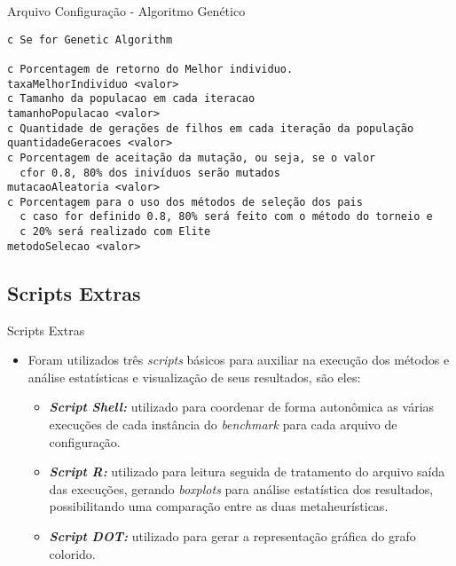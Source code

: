 			\begin{frame}[fragile]{Arquivo Configuração - Algoritmo Genético}
				
					
					{
						\footnotesize
						\begin{block}{}
							
							\begin{verbatim}
c Se for Genetic Algorithm

c Porcentagem de retorno do Melhor individuo.
taxaMelhorIndividuo <valor>
c Tamanho da populacao em cada iteracao
tamanhoPopulacao <valor>
c Quantidade de gerações de filhos em cada iteração da população
quantidadeGeracoes <valor>
c Porcentagem de aceitação da mutação, ou seja, se o valor
  cfor 0.8, 80% dos inivíduos serão mutados
mutacaoAleatoria <valor>
c Porcentagem para o uso dos métodos de seleção dos pais
  c caso for definido 0.8, 80% será feito com o método do torneio e
  c 20% será realizado com Elite
metodoSelecao <valor>
							\end{verbatim}	
						\end{block}
					}
				
			\end{frame}
        
        
        
        
        
		\subsection{Scripts Extras}
		
			\begin{frame}{Scripts Extras}
				
				\begin{itemize}
					\item Foram utilizados três \textit{scripts} básicos para auxiliar na execução dos métodos e análise estatísticas e visualização de seus resultados, são eles:
					
					
					\begin{itemize}
						\item \textit{\textbf{Script Shell:}} utilizado para coordenar de forma autonômica as várias execuções de cada instância do \textit{benchmark} para cada arquivo de configuração.
						
						\bigskip
						
						\item \textit{\textbf{Script R:}} utilizado para leitura seguida de tratamento do arquivo saída das execuções, gerando \textit{boxplots} para análise estatística dos resultados, possibilitando uma comparação entre as duas metaheurísticas.
						
						\bigskip
						
						\item \textit{\textbf{Script DOT:}} utilizado para gerar a representação gráfica do grafo colorido.
					\end{itemize}
					
				\end{itemize}
				
			\end{frame}
            
            
            